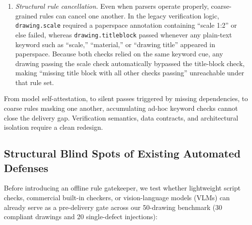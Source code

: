 \documentclass[nocopyright,nolists,upint,varvw,hyphenate]{asmejour}
\begin{document}
\begin{enumerate}
\item \emph{Structural rule cancellation.} Even when parsers operate properly, coarse-grained rules can cancel one another. In the legacy verification logic, \texttt{drawing.scale} required a paperspace annotation containing ``scale 1:2'' or else failed, whereas \texttt{drawing.titleblock} passed whenever any plain-text keyword such as ``scale,'' ``material,'' or ``drawing title'' appeared in paperspace. Because both checks relied on the same keyword cue, any drawing passing the scale check automatically bypassed the title-block check, making ``missing title block with all other checks passing'' unreachable under that rule set.
\end{enumerate}

From model self-attestation, to silent passes triggered by missing dependencies, to coarse rules masking one another, accumulating ad-hoc keyword checks cannot close the delivery gap. Verification semantics, data contracts, and architectural isolation require a clean redesign.

\subsection{Structural Blind Spots of Existing Automated Defenses}

Before introducing an offline rule gatekeeper, we test whether lightweight script checks, commercial built-in checkers, or vision-language models (VLMs) can already serve as a pre-delivery gate across our 50-drawing benchmark (30 compliant drawings and 20 single-defect injections):
\end{document}
